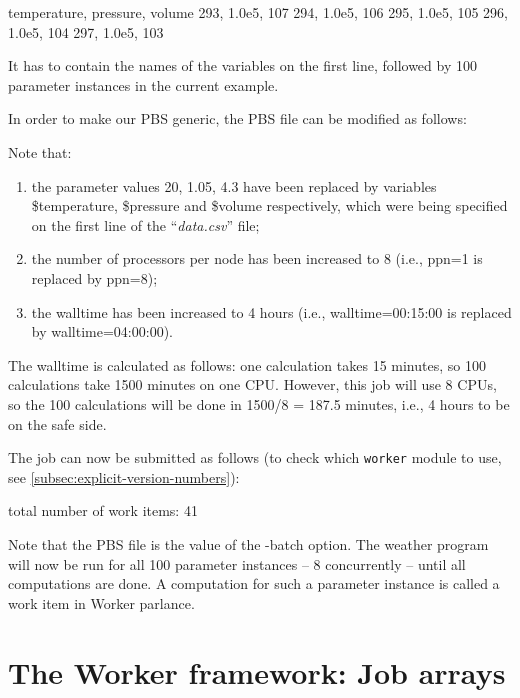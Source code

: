 \begin{prompt}
temperature, pressure, volume
293, 1.0e5, 107
294, 1.0e5, 106
295, 1.0e5, 105
296, 1.0e5, 104
297, 1.0e5, 103
\end{prompt}

It has to contain the names of the variables on the first line, followed by 100
parameter instances in the current example.

In order to make our PBS generic, the PBS file can be modified as follows:


Note that:

\begin{enumerate}
  \item  the parameter values 20, 1.05, 4.3 have been replaced by variables
    \$temperature, \$pressure and \$volume respectively, which were being specified
    on the first line of the ``\emph{data.csv}'' file;
  \item  the number of processors per node has been increased to 8 (i.e., ppn=1 is replaced by
    ppn=8);
  \item  the walltime has been increased to 4 hours (i.e.,
    walltime=00:15:00 is replaced by walltime=04:00:00).
\end{enumerate}

The walltime is calculated as follows: one calculation takes 15 minutes, so 100
calculations take 1500 minutes on one CPU. However, this job will use 8 CPUs,
so the 100 calculations will be done in 1500/8 = 187.5 minutes, i.e., 4 hours
to be on the safe side.

The job can now be submitted as follows (to check which \lstinline|worker| module to use,
see \autoref{subsec:explicit-version-numbers}):

\begin{prompt}
total number of work items: 41
\end{prompt}

Note that the PBS file is the value of the -batch option. The weather program
will now be run for all 100 parameter instances -- 8 concurrently -- until
all computations are done. A computation for such a parameter instance is
called a work item in Worker parlance.

\section{The Worker framework: Job arrays}

